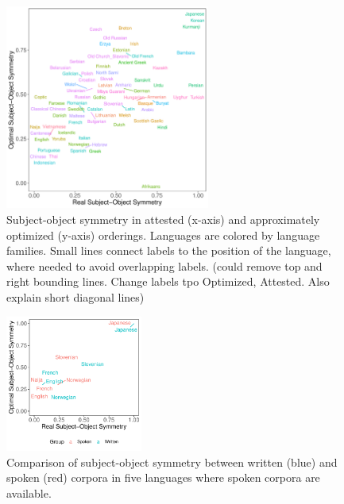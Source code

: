 \documentclass[11pt,a4paper]{article}
\newcommand\comment[1]{{\color{red}#1}}
\newcommand\mhahn[1]{{\color{red}(#1)}}
\begin{document}



\begin{figure}
    \centering
    \includegraphics[width=0.6\textwidth]{figures/fracion-optimized_DLM_2.6_format.pdf}
    \caption{Subject-object symmetry in attested (x-axis) and approximately optimized (y-axis) orderings. Languages are colored by language families. Small lines connect labels to the position of the language, where needed to avoid overlapping labels. \mhahn{could remove top and right bounding lines. Change labels tpo Optimized, Attested. Also explain short diagonal lines}}
    \label{fig:study1}
\end{figure}

\begin{figure}
    \centering
    \includegraphics[width=0.4\textwidth]{analysis_spoken/spoken.pdf}
    \caption{Comparison of subject-object symmetry between written (blue) and spoken (red) corpora in five languages where spoken corpora are available.}
    \label{fig:spoken}
\end{figure}
\end{document}
